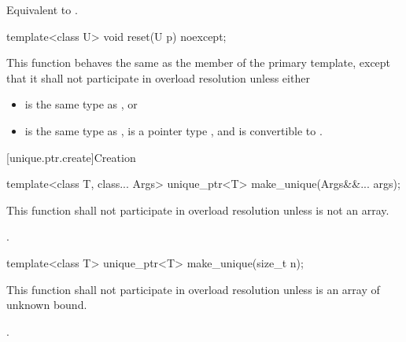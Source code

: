 \begin{itemdescr}
\pnum
\effects Equivalent to .
\end{itemdescr}

%
\begin{itemdecl}
template<class U> void reset(U p) noexcept;
\end{itemdecl}

\begin{itemdescr}
\pnum
This function behaves the same as
the  member of the primary template,
except that it shall not participate in overload resolution
unless either

\begin{itemize}
\item {} is the same type as , or
\item {} is the same type as ,
       is a pointer type , and
       is convertible to .
\end{itemize}
\end{itemdescr}

[unique.ptr.create]{Creation}

%
\begin{itemdecl}
template<class T, class... Args> unique_ptr<T> make_unique(Args&&... args);
\end{itemdecl}

\begin{itemdescr}
\pnum
\remarks This function shall not participate in overload resolution unless  is not an array.

\pnum
\returns {}.

\end{itemdescr}

%
\begin{itemdecl}
template<class T> unique_ptr<T> make_unique(size_t n);
\end{itemdecl}

\begin{itemdescr}
\pnum
\remarks This function shall not participate in overload resolution unless  is an array of unknown bound.

\pnum
\returns {}.

\end{itemdescr}

